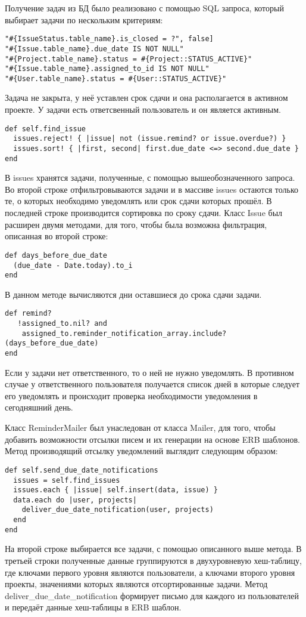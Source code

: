 Получение задач из БД было реализовано с помощью SQL запроса, который выбирает
задачи по нескольким критериям:
\small{\begin{lstlisting}
"#{IssueStatus.table_name}.is_closed = ?", false]
"#{Issue.table_name}.due_date IS NOT NULL"
"#{Project.table_name}.status = #{Project::STATUS_ACTIVE}"
"#{Issue.table_name}.assigned_to_id IS NOT NULL"
"#{User.table_name}.status = #{User::STATUS_ACTIVE}"
\end{lstlisting}}
Задача не закрыта, у неё уставлен срок сдачи и она располагается в активном
проекте. У задачи есть ответсвенный пользователь и он является активным.
\small{\begin{lstlisting}
def self.find_issue
  issues.reject! { |issue| not (issue.remind? or issue.overdue?) }
  issues.sort! { |first, second| first.due_date <=> second.due_date }
end
\end{lstlisting}}
В issues хранятся задачи, полученные, с помощью вышеобозначенного запроса. Во
второй строке отфильтровываются задачи и в массиве issues остаются только те,
о которых необходимо уведомлять или срок сдачи которых прошёл. В последней
строке производится сортировка по сроку сдачи. Класс Issue был расширен двумя
методами, для того, чтобы была возможна фильтрация, описанная во второй строке:
\small{\begin{lstlisting}
def days_before_due_date
  (due_date - Date.today).to_i
end
\end{lstlisting}}
В данном методе вычисляются дни оставшиеся до срока сдачи задачи.
\small{\begin{lstlisting}
def remind?
   !assigned_to.nil? and
    assigned_to.reminder_notification_array.include?(days_before_due_date)
end
\end{lstlisting}}
Если у задачи нет ответственного, то о ней не нужно уведомлять. В противном
случае у ответственного пользователя получается список дней в которые
следует его уведомлять и происходит проверка необходимости уведомления в
сегодняшний день.


Класс ReminderMailer был унаследован от класса Mailer, для того, чтобы добавить
возможности отсылки писем и их генерации на основе ERB шаблонов. Метод
производящий отсылку уведомлений выглядит следующим образом:
\small{\begin{lstlisting}
def self.send_due_date_notifications
  issues = self.find_issues
  issues.each { |issue| self.insert(data, issue) }
  data.each do |user, projects|
    deliver_due_date_notification(user, projects)
  end
end
\end{lstlisting}}
На второй строке выбирается все задачи, с помощью описанного выше метода. В
третьей строки полученные данные группируются в двухуровневую хеш-таблицу, где
ключами первого уровня являются пользователи, а ключами второго уровня проекты,
значениями которых являются отсортированные задачи. Метод
deliver\_due\_date\_notification формирует письмо для каждого из
пользователей и передаёт данные хеш-таблицы в ERB шаблон. 


